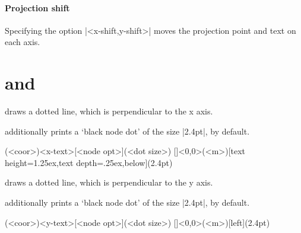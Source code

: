 \begin{tzcode}{.3}
\end{tzcode}

\paragraph{Projection shift}
Specifying the option |<x-shift,y-shift>| moves the projection point and text on each axis.

\begin{tzcode}{.3}
\end{tzcode}


\section{\protect\cmd{\tzprojx(*)} and \protect\cmd{\tzprojy(*)}}
\label{s:tzprojx}

\icmd{\tzprojx} draws a dotted line, which is perpendicular to the x axis.

\icmd{\tzprojx*} additionally prints a `black node dot' of the size |2.4pt|, by default.


\begin{tzdef}{}
  (<coor>){<x-text>}[<node opt>](<dot size>)
  []<0,0>(<m>){}[text height=1.25ex,text depth=.25ex,below](2.4pt)
\end{tzdef}


\icmd{\tzprojy} draws a dotted line, which is perpendicular to the y axis.

\icmd{\tzprojy*} additionally prints a `black node dot' of the size |2.4pt|, by default.

\begin{tzdef}{}
  (<coor>){<y-text>}[<node opt>](<dot size>)
  []<0,0>(<m>){}[left](2.4pt)
\end{tzdef}


